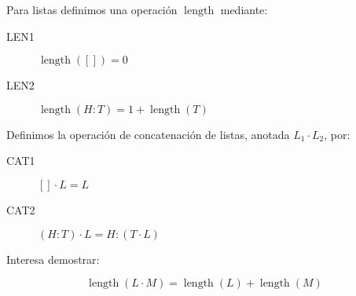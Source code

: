   Para listas definimos una operación \(\operatorname{length}\)
  mediante:
  \begin{description}
  \item[LEN1]
    \(\operatorname{length}([]) = 0\)
  \item[LEN2]
    \(\operatorname{length}(H : T) = 1 + \operatorname{length}(T)\)
  \end{description}
  Definimos la operación de concatenación de listas,
  anotada \(L_1 \cdot L_2\),
  por:
  \begin{description}
  \item[CAT1]
    \([] \cdot L = L\)
  \item[CAT2]
    \((H : T) \cdot L = H : (T \cdot L)\)
  \end{description}
  Interesa demostrar:
  \begin{theorem}
    \label{theo:largo-concatenacion-listas}
    \begin{equation}
      \label{eq:largo-concatenado}
      \operatorname{length}(L \cdot M)
      = \operatorname{length}(L) + \operatorname{length}(M)
    \end{equation}
  \end{theorem}
